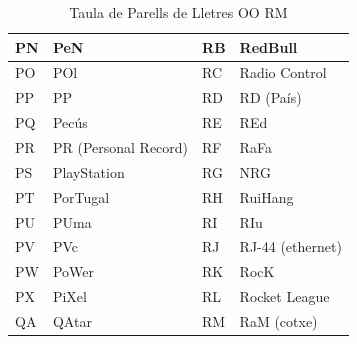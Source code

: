 \begin{table}[ht]
\begin{tabular}{|l|l|l|l|}
        PN & PeN                   & RB & RedBull          \\ \hline
        PO & POl                   & RC & Radio Control    \\ \hline
        PP & PP                    & RD & RD (País)        \\ \hline
        PQ & Pecús                 & RE & REd              \\ \hline
        PR & PR (Personal Record)  & RF & RaFa             \\ \hline
        PS & PlayStation           & RG & NRG              \\ \hline
        PT & PorTugal              & RH & RuiHang          \\ \hline
        PU & PUma                  & RI & RIu              \\ \hline
        PV & PVc                   & RJ & RJ-44 (ethernet) \\ \hline
        PW & PoWer                 & RK & RocK             \\ \hline
        PX & PiXel                 & RL & Rocket League    \\ \hline
        QA & QAtar                 & RM & RaM (cotxe)      \\ \hline
    \end{tabular}
    \caption{Taula de Parells de Lletres OO \rightarrow RM}
    \label{tla:lletres-6}
\end{table}


